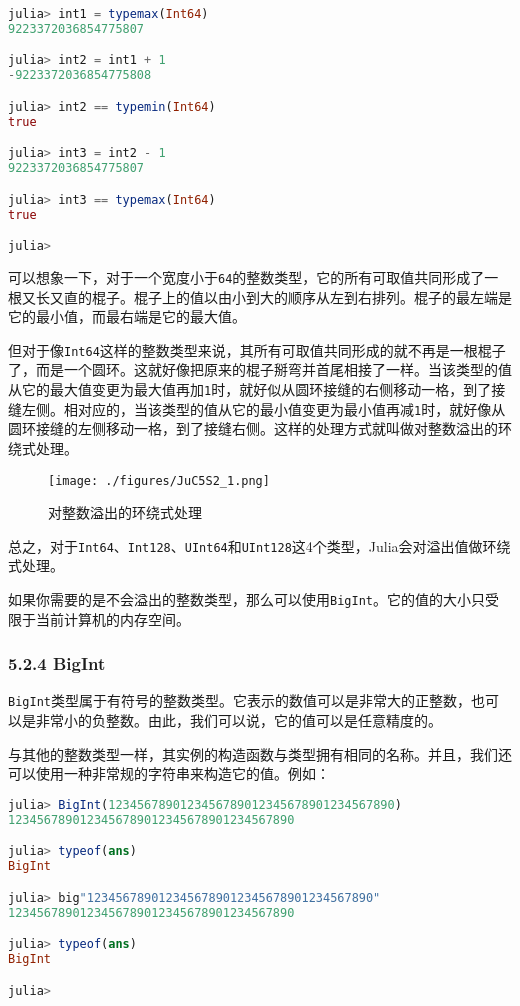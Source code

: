 \begin{lstlisting}[language=julia]
julia> int1 = typemax(Int64)
9223372036854775807

julia> int2 = int1 + 1
-9223372036854775808

julia> int2 == typemin(Int64)
true

julia> int3 = int2 - 1
9223372036854775807

julia> int3 == typemax(Int64)
true

julia> 
\end{lstlisting}

可以想象一下，对于一个宽度小于\verb|64|的整数类型，它的所有可取值共同形成了一根又长又直的棍子。棍子上的值以由小到大的顺序从左到右排列。棍子的最左端是它的最小值，而最右端是它的最大值。

但对于像\verb|Int64|这样的整数类型来说，其所有可取值共同形成的就不再是一根棍子了，而是一个圆环。这就好像把原来的棍子掰弯并首尾相接了一样。当该类型的值从它的最大值变更为最大值再加\verb|1|时，就好似从圆环接缝的右侧移动一格，到了接缝左侧。相对应的，当该类型的值从它的最小值变更为最小值再减\verb|1|时，就好像从圆环接缝的左侧移动一格，到了接缝右侧。这样的处理方式就叫做对整数溢出的环绕式处理。

\begin{figure}[ht]
\centering
\texttt{[image: ./figures/JuC5S2\_1.png]}
\caption{对整数溢出的环绕式处理} \label{JuC5S2_fig1}
\end{figure}

总之，对于\verb|Int64|、\verb|Int128|、\verb|UInt64|和\verb|UInt128|这4个类型，Julia会对溢出值做环绕式处理。

如果你需要的是不会溢出的整数类型，那么可以使用\verb|BigInt|。它的值的大小只受限于当前计算机的内存空间。

\subsubsection{5.2.4 BigInt}

\verb|BigInt|类型属于有符号的整数类型。它表示的数值可以是非常大的正整数，也可以是非常小的负整数。由此，我们可以说，它的值可以是任意精度的。

与其他的整数类型一样，其实例的构造函数与类型拥有相同的名称。并且，我们还可以使用一种非常规的字符串来构造它的值。例如：

\begin{lstlisting}[language=julia]
julia> BigInt(1234567890123456789012345678901234567890)
1234567890123456789012345678901234567890

julia> typeof(ans)
BigInt

julia> big"1234567890123456789012345678901234567890"
1234567890123456789012345678901234567890

julia> typeof(ans)
BigInt

julia>
\end{lstlisting}

